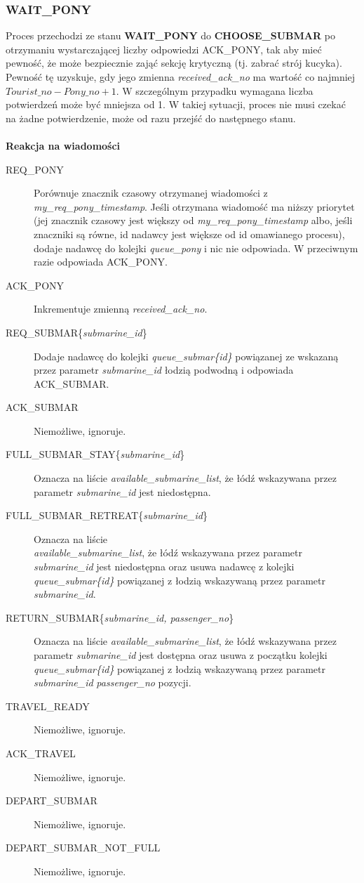 \documentclass[a4paper]{article}
\begin{document}
\resetlinenumber[1]\linenumbers
\subsubsection{\textbf{WAIT\_PONY}}
Proces przechodzi ze stanu \textbf{WAIT\_PONY} do \textbf{CHOOSE\_SUBMAR} po otrzymaniu wystarczającej liczby odpowiedzi ACK\_PONY,
tak aby mieć pewność, że może bezpiecznie zająć sekcję krytyczną (tj. zabrać strój kucyka). Pewność tę uzyskuje, gdy jego zmienna
\textit{received\_ack\_no} ma wartość co najmniej $\textit{Tourist\_no} - \textit{Pony\_no} + 1$.
W szczególnym przypadku wymagana liczba potwierdzeń może być mniejsza od 1. W takiej sytuacji, proces nie musi czekać na żadne potwierdzenie, może od razu przejść do następnego stanu.
\\
\\
\textbf{Reakcja na wiadomości}
\begin{description}
    \item [REQ\_PONY] Porównuje znacznik czasowy otrzymanej wiadomości z \textit{my\_req\_pony\_timestamp}. Jeśli otrzymana wiadomość ma niższy priorytet (jej znacznik czasowy jest większy od \textit{my\_req\_pony\_timestamp}
     albo, jeśli znaczniki są równe, id nadawcy jest większe od id omawianego procesu), dodaje nadawcę do kolejki \textit{queue\_pony} i nic nie odpowiada. W przeciwnym razie odpowiada ACK\_PONY.
    \item [ACK\_PONY] Inkrementuje zmienną \textit{received\_ack\_no}.
    \item [REQ\_SUBMAR\{\textit{submarine\_id}\}] Dodaje nadawcę do kolejki \textit{queue\_submar\{id\}} powiązanej ze wskazaną przez parametr \textit{submarine\_id} łodzią podwodną i odpowiada ACK\_SUBMAR.
    \item [ACK\_SUBMAR] Niemożliwe, ignoruje.
    \item [FULL\_SUBMAR\_STAY\{\textit{submarine\_id}\}] Oznacza na liście \textit{available\_submarine\_list}, że łódź wskazywana przez parametr \textit{submarine\_id} jest niedostępna.
    \item [FULL\_SUBMAR\_RETREAT\{\textit{submarine\_id}\}] Oznacza na liście\\
     \textit{available\_submarine\_list}, że łódź wskazywana przez parametr \textit{submarine\_id} jest niedostępna oraz usuwa nadawcę z kolejki \textit{queue\_submar\{id\}} powiązanej z łodzią wskazywaną przez parametr \textit{submarine\_id}.
    \item [RETURN\_SUBMAR\{\textit{submarine\_id, passenger\_no}\}] Oznacza na liście \textit{available\_submarine\_list}, że łódź wskazywana przez parametr \textit{submarine\_id} jest dostępna
    oraz usuwa z początku kolejki \textit{queue\_submar\{id\}} powiązanej z łodzią wskazywaną przez parametr \textit{submarine\_id} \textit{passenger\_no} pozycji.
    \item [TRAVEL\_READY] Niemożliwe, ignoruje.
    \item [ACK\_TRAVEL] Niemożliwe, ignoruje.
    \item [DEPART\_SUBMAR] Niemożliwe, ignoruje.
    \item [DEPART\_SUBMAR\_NOT\_FULL] Niemożliwe, ignoruje.
\end{description}
\end{document}
